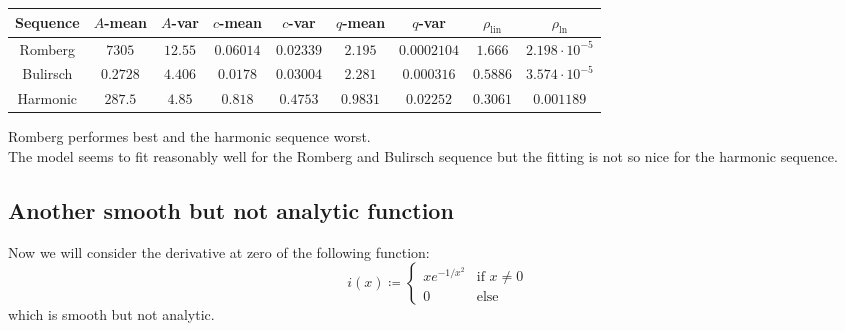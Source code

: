 \begin{table}[H]
    \centering
    \small
    \begin{tabular}{c||c|c|c|c|c|c|c|c}
Sequence & \(A\)-mean & \(A\)-var & \(c\)-mean & \(c\)-var & \(q\)-mean & \(q\)-var & \(\rho_{\operatorname{lin}}\) & \(\rho_{\ln}\)\\\hline
\rowcolor{green}
Romberg & \(7305\) & \(12.55\) & \(0.06014\) & \(0.02339\) & \(2.195\) & \(0.0002104\) & \(1.666\) & \(2.198\cdot 10^{-5}\) \\
\rowcolor{green}
Bulirsch & \(0.2728\) & \(4.406\) & \(0.0178\) & \(0.03004\) & \(2.281\) & \(0.000316\) & \(0.5886\) & \(3.574\cdot 10^{-5}\) \\
\rowcolor{red}
Harmonic & \(287.5\) & \(4.85\) & \(0.818\) & \(0.4753\) & \(0.9831\) & \(0.02252\) & \(0.3061\) & \(0.001189\) \\
    \end{tabular}
    \label{tab:my_label}
\end{table}

Romberg performes best and the harmonic sequence worst.\\

The model seems to fit reasonably well for the Romberg and Bulirsch sequence but the fitting is not so nice for the harmonic sequence.

\subsection{Another smooth but not analytic function}

Now we will consider the derivative at zero of the following function:
\[
i(x)\coloneqq \begin{cases}
xe^{-1/x^2} & \text{if } x \neq 0\\
0 & \text{else}
\end{cases}
\]
which is smooth but not analytic.

